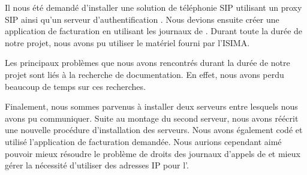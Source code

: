 
Il nous été demandé d'installer une solution de téléphonie SIP utilisant un proxy SIP {\kam} ainsi qu'un serveur d'authentification {\rad} {\frad}. Nous devions ensuite créer une application de facturation en utilisant les journaux de {\frad}. Durant toute la durée de notre projet, nous avons pu utiliser le matériel fourni par l'ISIMA.

Les principaux problèmes que nous avons rencontrés durant la durée de notre projet sont liés à la recherche de documentation. En effet, nous avons perdu beaucoup de temps sur ces recherches. 

Finalement, nous sommes parvenus à installer deux serveurs entre lesquels nous avons pu communiquer. Suite au montage du second serveur, nous avons réécrit une nouvelle procédure d'installation des serveurs.  
Nous avons également codé et utilisé l'application de facturation demandée.
Nous aurions cependant aimé pouvoir mieux résoudre le problème de droits des journaux d'appels de {\frad} et mieux gérer la nécessité d'utiliser des adresses IP pour l'{\ata}.


